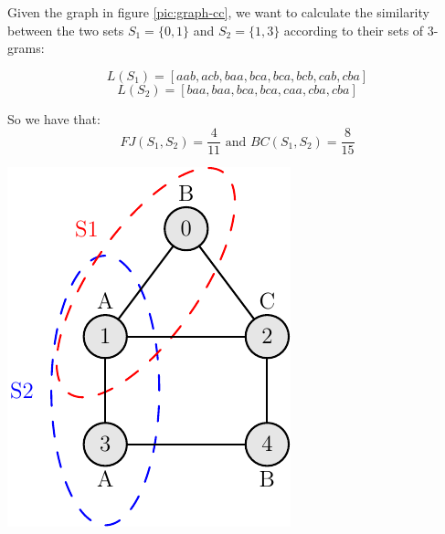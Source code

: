 \begin{minipage}{0.60\textwidth}\raggedright
	\begin{esempio}
	\end{esempio}
	
	Given the graph in figure \ref{pic:graph-cc}, we want to calculate the similarity between the two sets $S_{1} = \{0,1\}$ and $S_{2} = \{1, 3\}$ according to their sets of $3$-grams:
	
	\begin{equation*}
	L(S_{1}) = [aab, acb, baa, bca, bca, bcb, cab, cba]
	\end{equation*}
	\begin{equation*}
	L(S_{2}) = [baa, baa, bca, bca, caa, cba, cba]
	\end{equation*}
	
	So we have that:
	\begin{equation*}
	FJ(S_{1}, S_{2}) = \frac{4}{11} \text{  and  } BC(S_{1}, S_{2}) = \frac{8}{15}
	\end{equation*}
\end{minipage}
\begin{minipage}{0.30\textwidth}
	\includegraphics[width=\linewidth]{figure/figure-2-1}
	\label{pic:graph-cc}
\end{minipage}


